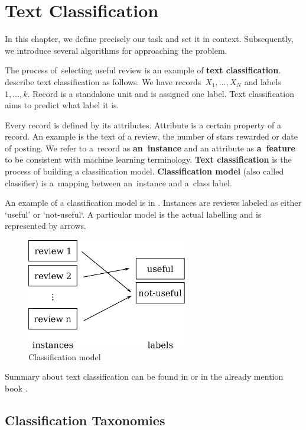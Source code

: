 \chapter{Text Classification}\label{chap:cls}

In this chapter, we define precisely our task and set it in context.
Subsequently, we introduce several algorithms for approaching the problem.

The process of~selecting useful review is an example of {\bf text classification}.
\citet{AggZhai12} describe text classification as follows.
We have records~$X_1, \ldots, X_N$ and labels~$1,\ldots, k$.
Record is a standalone unit and is assigned one label.
Text classification aims to predict what label it is.

Every record is defined by its attributes.
Attribute is a certain property of a record.
An example is the text of a review, the number of stars rewarded or date of posting.
We refer to a~record as \textbf{an~instance} and an attribute as \textbf{a~feature} to be consistent with machine learning terminology.
{\bf Text classification} is the process of building a classification model.
{\bf Classification model} (also called classifier) is a~mapping between an~instance and a~class label.

An example of a classification model is in .
Instances are reviews labeled as either `useful' or `not-useful`.
A particular model is the actual labelling and is represented by arrows.

\begin{figure}[h]
	\centering
	\includegraphics[width=7cm]{figures/model.eps}
	\caption{Classification model} \label{fig:cls_model}
\end{figure}

Summary about text classification can be found in \citet{korde2012text} or
 in the already mention book \citet{AggZhai12}.

\section{Classification Taxonomies}

